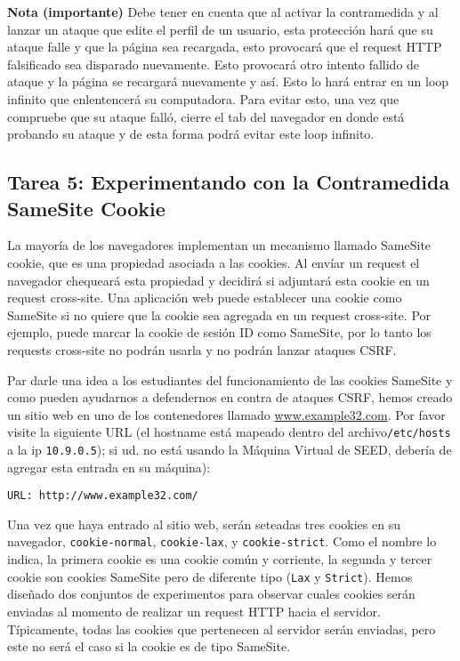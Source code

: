 \textbf{Nota (importante)} Debe tener en cuenta que al activar la contramedida y al lanzar un ataque que edite el perfil de un usuario, esta protección hará que su ataque falle y que la página sea recargada, esto provocará que el request HTTP falsificado sea disparado nuevamente. Esto provocará otro intento fallido de ataque y la página se recargará nuevamente y así. Esto lo hará entrar en un loop infinito que enlentencerá su computadora. Para evitar esto, una vez que compruebe que su ataque falló, cierre el tab del navegador en donde está probando su ataque y de esta forma podrá evitar este loop infinito.



\subsection{Tarea 5: Experimentando con la Contramedida SameSite Cookie} 

La mayoría de los navegadores implementan un mecanismo llamado SameSite cookie, que es una propiedad asociada a las cookies. Al envíar un request el navegador chequeará esta propiedad y decidirá si adjuntará esta cookie en un request cross-site. Una aplicación web puede establecer una cookie como SameSite si no quiere que la cookie sea agregada en un request cross-site. Por ejemplo, puede marcar la cookie de sesión ID como SameSite, por lo tanto los requests cross-site no podrán usarla y no podrán lanzar ataques CSRF.

Par darle una idea a los estudiantes del funcionamiento de las cookies SameSite y como pueden ayudarnos a defendernos en contra de ataques CSRF, hemos creado un sitio web en uno de los contenedores llamado \url{www.example32.com}. Por favor visite la siguiente URL (el hostname está mapeado dentro del archivo\texttt{/etc/hosts} a la ip \texttt{10.9.0.5}); si ud. no está usando la Máquina Virtual de SEED, debería de agregar esta entrada en su máquina):

\begin{lstlisting}
URL: http://www.example32.com/
\end{lstlisting}

Una vez que haya entrado al sitio web, serán seteadas tres cookies en su navegador, \texttt{cookie-normal}, \texttt{cookie-lax},
y \texttt{cookie-strict}. Como el nombre lo indica, la primera cookie es una cookie común y corriente, la segunda y tercer cookie son cookies SameSite pero de diferente tipo (\texttt{Lax} y \texttt{Strict}). Hemos diseñado dos conjuntos de experimentos para observar cuales cookies serán enviadas al momento de realizar un request HTTP hacia el servidor. Típicamente, todas las cookies que pertenecen al servidor serán enviadas, pero este no será el caso si la cookie es de tipo SameSite.

